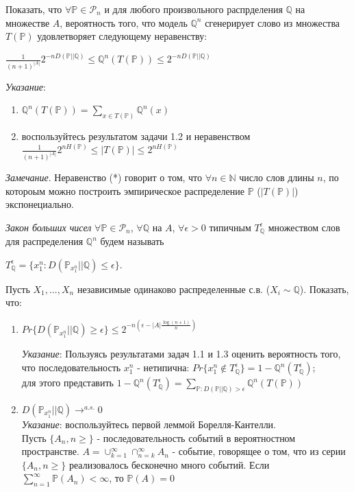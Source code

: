 \begin{problem}
Показать, что $\forall \mathbb{P} \in \mathcal{P}_n$ и для любого произвольного распрделения $\mathbb{Q}$ на множестве $A$, вероятность того, что модель $\mathbb{Q}^n$ сгенерирует слово из множества $T(\mathbb{P})$ удовлетворяет следующему неравенству:
\begin{center}
$\frac{1}{(n+1)^{|A|}} 2^{-nD(\mathbb{P}||\mathbb{Q})} \leq \mathbb{Q}^n(T(\mathbb{P})) \leq 2^{-nD(\mathbb{P}||\mathbb{Q})}$
\end{center}
\emph{Указание}:
\begin{enumerate}
\item $\mathbb{Q}^n(T(\mathbb{P})) = \sum_{x \in T(\mathbb{P})} \mathbb{Q}^n(x)$
\item воспользуйтесь результатом задачи 1.2 и неравенством \\
$\frac{1}{(n+1)^{|A|}} 2^{nH(\mathbb{P})} \leq |T(\mathbb{P})| \leq 2^{nH(\mathbb{P})} $
\end{enumerate}
\textit{Замечание}. Неравенство (*) говорит о том, что $\forall n \in \mathbb{N}$ число слов длины $n$, по котороым можно построить эмпирическое распределение $\mathbb{P}$ ($|T(\mathbb{P})|$) экспонециально.
\end{problem}

\begin{problem}
\textit{Закон больших чисел}
$\forall \mathbb{P} \in \mathcal{P}_n $, $\forall \mathbb{Q}$ на $A$, $\forall \epsilon > 0$ типичным $T_{\mathbb{Q}}^{\epsilon}$ множеством слов для распределения $\mathbb{Q}^n$ будем называть
\begin{center}
$T_{\mathbb{Q}}^{\epsilon} = \{x_1^n: D(\mathbb{P}_{x_1^n}|| \mathbb{Q}) \leq \epsilon \}$.
\end{center}
Пусть $X_1, ..., X_n$ независимые одинаково распределенные с.в. ($X_i \sim \mathbb{Q}$). Показать, что:
\begin{enumerate}
\item 
\begin{center}
$Pr\{D(\mathbb{P}_{x_1^n} || \mathbb{Q}) \geq \epsilon \} \leq 2^{-n(\epsilon - |A|\frac{\log(n+1)}{n})}$
\end{center}
\textit{Указание}:
Пользуясь результатами задач 1.1 и 1.3 оценить вероятность того, что последовательность $x_1^n$ - нетипична: $Pr\{x_1^n \not\in T_{\mathbb{Q}}^{\epsilon}\} = 1 - \mathbb{Q}^n(T_{\mathbb{Q}}^{\epsilon})$;\\
для этого представить $1 - \mathbb{Q}^n(T_{\mathbb{Q}}^{\epsilon}) = \sum_{\mathbb{P}: D(\mathbb{P}||\mathbb{Q}) > \epsilon}{ \mathbb{Q}^n(T(\mathbb{P}))}$ 
\item $D(\mathbb{P}_{x_1^n}||\mathbb{Q})\rightarrow^{a.s.}0$\\
\textit{Указание}: воспользуйтесь первой леммой Борелля-Кантелли.\\
Пусть $\{A_n, n \geq \}$ - последовательность событий в вероятностном пространстве. $A = \cup_{k = 1}^{\infty} \cap_{n = k}^{\infty} A_n$ - событие, говорящее о том, что из серии $\{A_n, n \geq \}$ реализовалось бесконечно много событий.
Если $\sum_{n=1}^{\infty}\mathbb{P}(A_n) < \infty$, то $\mathbb{P}(A) = 0$
\end{enumerate}
\end{problem}

